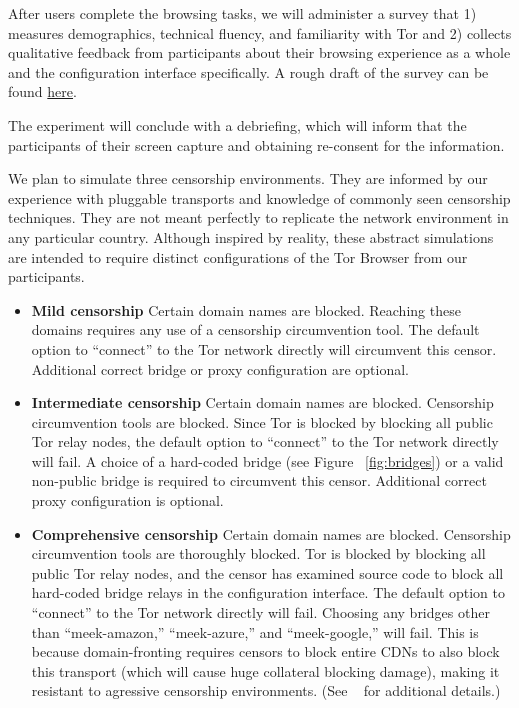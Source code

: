 \documentclass{template}
\begin{document}
After users complete the browsing tasks, we will administer a survey that 1)
measures demographics, technical fluency, and
familiarity with Tor and 2) collects qualitative feedback from
participants about their browsing experience as a whole
and the configuration interface specifically.
A rough draft of the survey can be
found
\href{http://www.surveygizmo.com/collab/2085559/Tor-Usability-Survey}{here}.

The experiment will conclude with a debriefing, which will inform that the
participants of their screen capture and obtaining re-consent for the
information. 

We plan to simulate three censorship environments.
They are informed by our experience with pluggable transports
and knowledge of commonly seen censorship techniques.
They are not meant perfectly to replicate the network environment
in any particular country. Although inspired by reality, these
abstract simulations are intended to require distinct configurations
of the Tor Browser from our participants. 

\begin{itemize} \itemsep1pt \parskip0pt 
\item {\bfseries Mild censorship} 
Certain domain names are blocked. Reaching these 
domains requires any use of a censorship circumvention 
tool. The default option to ``connect'' to the Tor network 
directly will circumvent this censor. Additional correct
bridge or proxy configuration are optional. 
\item {\bfseries Intermediate censorship} 
Certain domain names are blocked. Censorship circumvention
tools are blocked. Since Tor is blocked by blocking all public Tor
relay nodes, the default option to ``connect'' to the Tor network
directly will fail. A choice of a hard-coded bridge (see Figure ~\ref{fig:bridges})
or a valid non-public bridge is required to circumvent this censor.  
Additional correct proxy configuration is optional.
\item {\bfseries Comprehensive censorship} 
Certain domain names are blocked. Censorship circumvention tools
are thoroughly blocked. Tor is blocked by blocking all public
Tor relay nodes, and the censor has examined source code to block
all hard-coded bridge relays in the configuration interface. The default option
to ``connect'' to the Tor network directly will fail. Choosing any bridges other than
``meek-amazon,'' ``meek-azure,'' and ``meek-google,'' will fail. This is because 
domain-fronting requires censors to block entire CDNs to also block this
transport (which will cause huge collateral blocking damage), making it resistant to agressive censorship environments.
(See ~\cite{fifield2015blocking} for additional details.)\\
\end{itemize}
\end{document}
